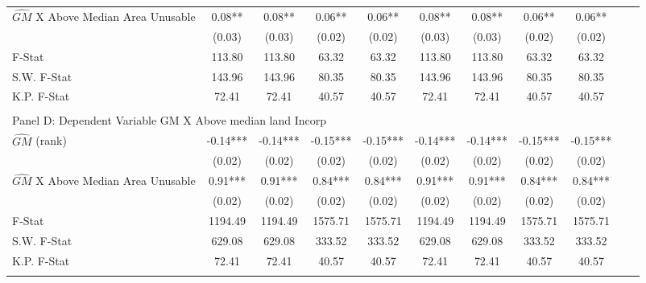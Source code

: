 \begin{table}[htbp]
\begin{threeparttable}
\begin{tabular}{l*{10}{c}}
\addlinespace
$\hat{GM}$ X Above Median Area Unusable&       0.08** &       0.08** &       0.06** &       0.06** &       0.08** &       0.08** &       0.06** &       0.06** \\
                &     (0.03)   &     (0.03)   &     (0.02)   &     (0.02)   &     (0.03)   &     (0.03)   &     (0.02)   &     (0.02)   \\
\midrule
F-Stat          &     113.80   &     113.80   &      63.32   &      63.32   &     113.80   &     113.80   &      63.32   &      63.32   \\
S.W. F-Stat     &     143.96   &     143.96   &      80.35   &      80.35   &     143.96   &     143.96   &      80.35   &      80.35   \\
K.P. F-Stat     &      72.41   &      72.41   &      40.57   &      40.57   &      72.41   &      72.41   &      40.57   &      40.57   \\
\cmidrule[\heavyrulewidth](lr){1-9} \\ \cmidrule[\heavyrulewidth](lr){1-9}
\multicolumn{8}{l}{Panel D: Dependent Variable GM X Above median land Incorp}\\
\cmidrule(lr){1-9}
$\hat{GM}$ (rank)&      -0.14***&      -0.14***&      -0.15***&      -0.15***&      -0.14***&      -0.14***&      -0.15***&      -0.15***\\
                &     (0.02)   &     (0.02)   &     (0.02)   &     (0.02)   &     (0.02)   &     (0.02)   &     (0.02)   &     (0.02)   \\
\addlinespace
$\hat{GM}$ X Above Median Area Unusable&       0.91***&       0.91***&       0.84***&       0.84***&       0.91***&       0.91***&       0.84***&       0.84***\\
                &     (0.02)   &     (0.02)   &     (0.02)   &     (0.02)   &     (0.02)   &     (0.02)   &     (0.02)   &     (0.02)   \\
\midrule
F-Stat          &    1194.49   &    1194.49   &    1575.71   &    1575.71   &    1194.49   &    1194.49   &    1575.71   &    1575.71   \\
S.W. F-Stat     &     629.08   &     629.08   &     333.52   &     333.52   &     629.08   &     629.08   &     333.52   &     333.52   \\
K.P. F-Stat     &      72.41   &      72.41   &      40.57   &      40.57   &      72.41   &      72.41   &      40.57   &      40.57   \\
\cmidrule[\heavyrulewidth](lr){1-9} \\ \cmidrule[\heavyrulewidth](lr){1-9}

\end{tabular}
\end{threeparttable}
\end{table}
